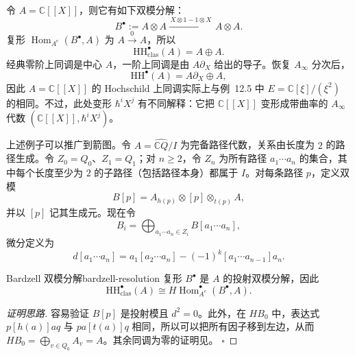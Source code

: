 \begin{example}
令 $A=\mathbb C[[X]]$，则它有如下双模分解：
\[
  B^{\bullet}:=A\otimes A\xrightarrow{\,X\otimes1-1\otimes X\,}A\otimes A.
\]
复形 $\operatorname{Hom}_{A^e}(B^{\bullet},A)$ 为 $A\xrightarrow{0}A$，所以
\[
  \mathrm{HH}^{\bullet}_{\mathrm{clas}}(A)=A\oplus A.
\]
经典零阶上同调是中心 $A$，一阶上同调是由 $A\partial_X$ 给出的导子。恢复 $A_\infty$ 分次后，
\[
  \mathrm{HH}^{\bullet}(A)=A\partial_X\oplus A,
\]
因此 $A=\mathbb C[[X]]$ 的 Hochschild 上同调实际上与例~12.5 中 $E=\mathbb C[\xi]/(\xi^2)$ 的相同。不过，此处变形 $\hbar^iX^j$ 有不同解释：它把 $\mathbb C[[X]]$ 变形成带曲率的 $A_\infty$ 代数 $(\mathbb C[[X]],\hbar^iX^j)$。

上述例子可以推广到箭图。令 $A=\widehat{\mathbb C Q}/I$ 为完备路径代数，关系由长度为 $2$ 的路径生成。令 $Z_0=Q_0$、$Z_1=Q_1$；对 $n\geq2$，令 $Z_n$ 为所有路径 $a_1\cdots a_n$ 的集合，其中每个长度至少为 $2$ 的子路径（包括路径本身）都属于 $I$。对每条路径 $p$，定义双模
\[
  B[p]=A_{h(p)}\otimes[p]\otimes_{t(p)}A,
\]
并以 $[p]$ 记其生成元。现在令
\[
  B_i=\bigoplus_{a_1\cdots a_n\in Z_i}B[a_1\cdots a_n],
\]
微分定义为
\[
  d[a_1\cdots a_n]=a_1[a_2\cdots a_n]-(-1)^k[a_1\cdots a_{n-1}]a_n.
\]
\end{example}

\begin{theorem}{Bardzell 双模分解}{bardzell-resolution}
复形 $B^{\bullet}$ 是 $A$ 的投射双模分解，因此
\[
  \mathrm{HH}^{\bullet}_{\mathrm{clas}}(A)\cong H\operatorname{Hom}^{\bullet}_{A^e}(B^{\bullet},A).
\]
\end{theorem}
\begin{proof}[证明思路]
容易验证 $B[p]$ 是投射模且 $d^2=0$。此外，在 $H B_0$ 中，表达式 $p[h(a)]a q$ 与 $p a[t(a)]q$ 相同，所以可以把所有因子移到左边，从而 $H B_0=\bigoplus_{v\in Q_0}A_v=A$。其余同调为零的证明见。
\hfill$\square$
\end{proof}

